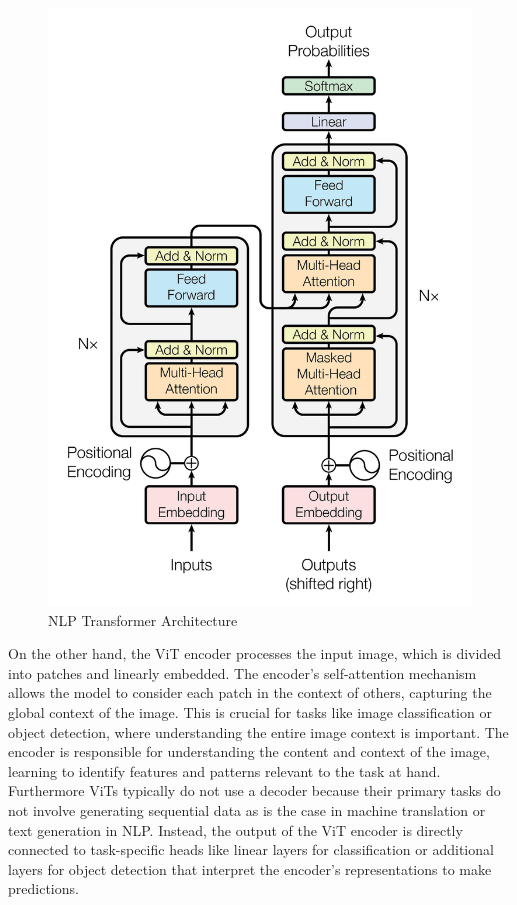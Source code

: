 \begin{figure}[h!]
    \centering
    \includegraphics[scale=0.2]{Figures/transformer_basis.jpg}
    \caption{NLP Transformer Architecture \cite{visiontr}}
    \label{fig:tr-base}
\end{figure}

\newpage
On the other hand, the ViT encoder processes the input image, which is divided into patches and linearly embedded. The encoder's self-attention mechanism 
allows the model to consider each patch in the context of others, capturing the global context of the image. This is crucial for tasks like image 
classification or object detection, where understanding the entire image context is important. The encoder is responsible for understanding the content and 
context of the image, learning to identify features and patterns relevant to the task at hand. Furthermore ViTs typically do not use a decoder because their 
primary tasks do not involve generating sequential data as is the case in machine translation or text generation in NLP. Instead, the output of the ViT 
encoder is directly connected to task-specific heads like linear layers for classification or additional layers for object detection that interpret the 
encoder's representations to make predictions.

